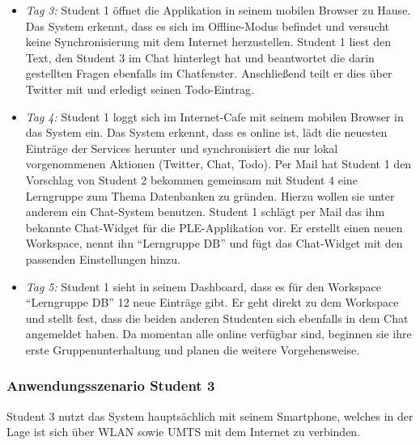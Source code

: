 \begin{itemize}
 \item \emph{Tag 3:} Student 1 öffnet die Applikation in seinem mobilen Browser zu Hause. Das System erkennt, dass es sich im Offline-Modus befindet und versucht keine Synchronisierung mit dem Internet herzustellen. Student 1 liest den Text, den Student 3 im Chat hinterlegt hat und beantwortet die darin gestellten Fragen ebenfalls im Chatfenster. Anschließend teilt er dies über Twitter mit und erledigt seinen Todo-Eintrag.
 \item \emph{Tag 4:} Student 1 loggt sich im Internet-Cafe mit seinem mobilen Browser in das System ein. Das System erkennt, dass es online ist, lädt die neuesten Einträge der Services herunter und synchronisiert die nur lokal vorgenommenen Aktionen (Twitter, Chat, Todo). Per Mail hat Student 1 den Vorschlag von Student 2 bekommen gemeinsam mit Student 4 eine Lerngruppe zum Thema Datenbanken zu gründen. Hierzu wollen sie unter anderem ein Chat-System benutzen. Student 1 schlägt per Mail das ihm bekannte Chat-Widget für die PLE-Applikation vor. Er erstellt einen neuen Workspace, nennt ihn “Lerngruppe DB” und fügt das Chat-Widget mit den passenden Einstellungen hinzu.
 \item \emph{Tag 5:} Student 1 sieht in seinem Dashboard, dass es für den Workspace “Lerngruppe DB” 12 neue Einträge gibt. Er geht direkt zu dem Workspace und stellt fest, dass die beiden anderen Studenten sich ebenfalls in dem Chat angemeldet haben. Da momentan alle online verfügbar sind, beginnen sie ihre erste Gruppenunterhaltung und planen die weitere Vorgehensweise.
\end{itemize}

\subsubsection*{Anwendungsszenario Student 3}
Student 3 nutzt das System hauptsächlich mit seinem Smartphone, welches in der Lage ist sich über WLAN sowie UMTS mit dem Internet zu verbinden.

